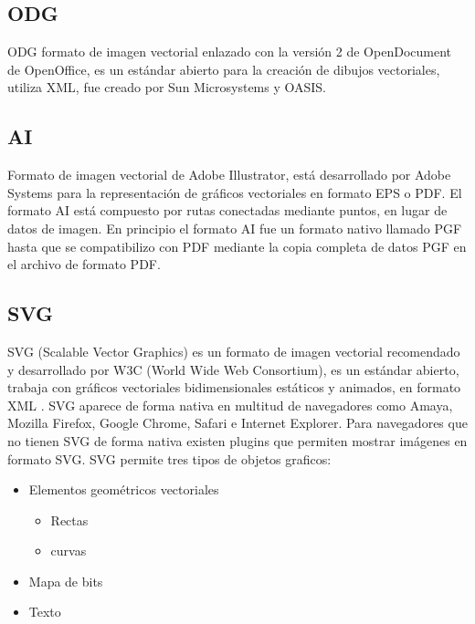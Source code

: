 \subsection{ODG}\label{ODG}


ODG formato de imagen vectorial enlazado con la versión 2 de OpenDocument de OpenOffice, es un estándar abierto para la creación de dibujos vectoriales, utiliza XML, fue creado por Sun Microsystems y OASIS.





\subsection{AI}\label{ai}

Formato de imagen vectorial de Adobe Illustrator, está desarrollado por Adobe Systems para la representación de gráficos vectoriales en formato EPS o PDF. El formato AI está compuesto por rutas conectadas mediante puntos, en lugar de datos de imagen. 
En principio el formato AI fue un formato nativo llamado PGF hasta que se compatibilizo con PDF mediante la copia completa de datos PGF en el archivo de formato PDF.




\subsection{SVG}\label{svg}


SVG (Scalable Vector Graphics) \cite{lasso_formatos_2015:a} es un formato de imagen vectorial recomendado y desarrollado por W3C (World Wide Web Consortium), es un estándar abierto, trabaja con gráficos vectoriales bidimensionales estáticos y animados, en formato XML \cite{noauthor_scalable_2017:a}.
SVG aparece de forma nativa en multitud de navegadores como Amaya, Mozilla Firefox, Google Chrome, Safari e Internet Explorer. Para navegadores que no tienen SVG de forma nativa existen plugins que permiten mostrar imágenes en formato SVG.
SVG permite tres tipos de objetos graficos:




\begin{itemize}
\item 
	Elementos geom\'{e}tricos vectoriales



\begin{itemize}
\item 
	Rectas 



\item 
	curvas
\end{itemize}


\item 
	Mapa de bits



\item 
	Texto



\end{itemize}


